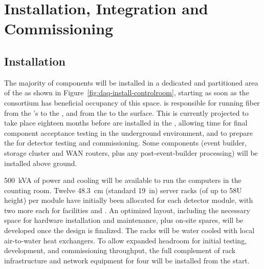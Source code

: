 
\section{Installation, Integration and Commissioning}
\label{sec:fdsp-daq-install}

\subsection{Installation}
\label{sec:fdsp-daq-install-transport}

The majority of  components will be installed in a dedicated and partitioned area of the  as shown in Figure~\ref{fig:daq-install-controlroom}, starting as soon as the consortium has beneficial occupancy of this space. %
 is responsible for running fiber from the 's  to the , and from the  to the surface. This is currently projected to take place eighteen months before  are installed in the , allowing time for final component acceptance testing in the underground environment, and to prepare the  for detector testing and commissioning. Some  components (event builder, storage cluster and WAN routers, plus any post-event-builder processing) will be installed above ground.

\SI{500}{kVA} of power and cooling will be available to run the computers in the counting room. 
Twelve \SI{48.3}{cm} (standard \SI{19}{in}) server racks (of up to 58U height) per module have initially been allocated for each detector module, with two more each for facilities and . An optimized layout, including the necessary space for hardware installation and maintenance, plus on-site spares, will be developed once the  design is finalized. The racks will be water cooled with local air-to-water heat exchangers. To allow expanded headroom for initial testing, development, and commissioning throughput, the full complement of rack infrastructure and network equipment for four  will be installed from the start.  %

